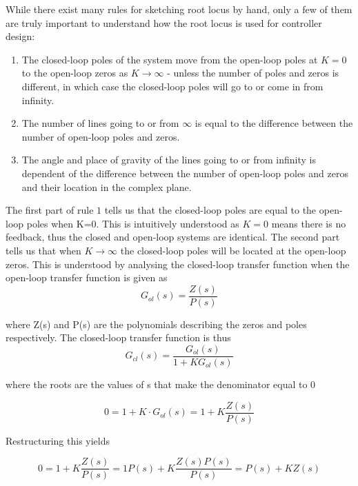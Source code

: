 While there exist many rules for sketching root locus by hand, only a few of them are truly important to understand how the root locus is used for controller design:

\begin{enumerate}
	\item The closed-loop poles of the system move from the open-loop poles at $ K=0 $ to the open-loop zeros as $K \to \infty$ - unless the number of poles and zeros is different, in which case the closed-loop poles will go to or come in from infinity.
	\item The number of lines going to or from $\infty$ is equal to the difference between the number of open-loop poles and zeros.
	\item The angle and place of gravity of the lines going to or from infinity is dependent of the difference between the number of open-loop poles and zeros and their location in the complex plane.
\end{enumerate}

The first part of rule $1$ tells us that the closed-loop poles are equal to the open-loop poles when K=0. This is intuitively understood as $ K=0 $ means there is no feedback, thus the closed and open-loop systems are identical. The second part tells us that when $K \to \infty$ the closed-loop poles will be located at the open-loop zeros. This is understood by analysing the closed-loop transfer function when the open-loop transfer function is given as
\begin{equation}
	G_{ol}(s) = \frac{Z(s)}{P(s)}
\end{equation}

where Z(s) and P(s) are the polynomials describing the zeros and poles respectively.
The closed-loop transfer function is thus
\begin{equation}
	G_{cl}(s) = \frac{G_{ol}(s)}{1 + K G_{ol}(s)}
\end{equation}

where the roots are the values of s that make the denominator equal to 0

\begin{equation}
	0 = 1 + K \cdot G_{ol}(s) = 1 + K \frac{Z(s)}{P(s)}
\end{equation}

Restructuring this yields

\begin{equation}
	0 = 1 + K \frac{Z(s)}{P(s)} = 1P(s) + K \frac{Z(s) P(s)}{P(s)} = P(s) + K Z(s)
\end{equation}

